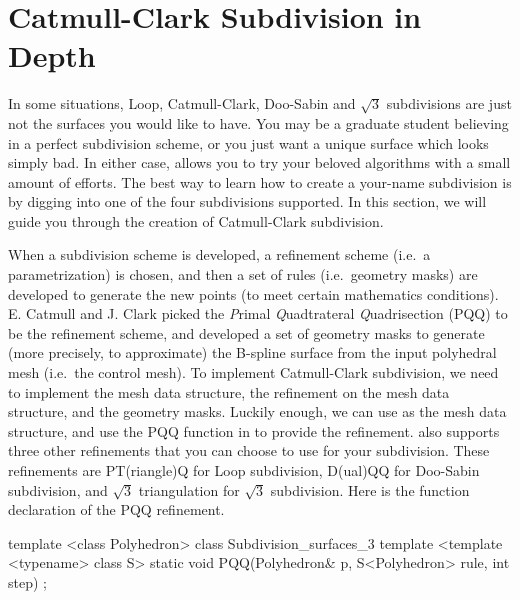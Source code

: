 \section{Catmull-Clark Subdivision in Depth}
\label{secCC}
In some situations, Loop, Catmull-Clark, Doo-Sabin and $\sqrt{3}$ 
subdivisions are just not the surfaces you would like to have. You 
may be a graduate student believing in a perfect subdivision scheme, or
you just want a unique surface which looks simply bad. In either case,
 allows you to try your beloved algorithms
with a small amount of efforts. The best way to learn how to create
a your-name subdivision is by digging into one of the four subdivisions
 supported. In this section, we will guide 
you through the creation of Catmull-Clark subdivision.

When a subdivision scheme is developed, a refinement scheme (i.e.~a 
parametrization) is chosen, and then a set of rules (i.e.~geometry 
masks) are developed to generate the new points (to meet certain 
mathematics conditions). E. Catmull and J. Clark picked the \emph{P}rimal 
\emph{Q}uadtrateral \emph{Q}uadrisection (PQQ) to be the refinement scheme,
and developed a set of geometry masks to generate (more precisely, to 
approximate) the B-spline surface from the input polyhedral mesh (i.e.~the 
control mesh). To implement Catmull-Clark subdivision, we need to 
implement the mesh data structure, the refinement on the mesh data 
structure, and the geometry masks. Luckily enough, we can use 
 as the mesh data structure, and use the 
PQQ function in  to provide the refinement. 
 also supports three other refinements that 
you can choose to use for your subdivision. These refinements are
PT(riangle)Q for Loop subdivision, D(ual)QQ for Doo-Sabin subdivision, 
and $\sqrt{3}$ triangulation for $\sqrt{3}$ 
subdivision. Here is the function declaration of the PQQ refinement.

\begin{ccExampleCode}
template <class Polyhedron>
class Subdivision_surfaces_3 {
  template <template <typename> class S>
  static void PQQ(Polyhedron& p, S<Polyhedron> rule, int step)
};
\end{ccExampleCode}

